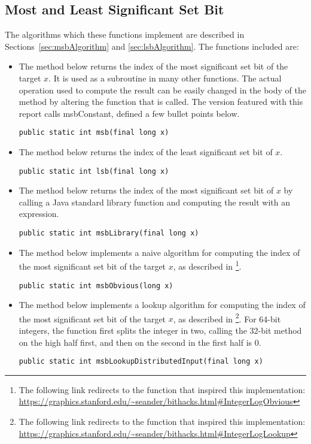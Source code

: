 \subsection{Most and Least Significant Set Bit}

The algorithms which these functions implement are described in Sections~\ref{sec:msbAlgorithm} and \ref{sec:lsbAlgorithm}.
The functions included are:

\begin{itemize}
    \item
    The method below returns the index of the most significant set bit of the target $x$. It is used as a subroutine in many other functions. The actual operation used to compute the result can be easily changed in the body of the method by altering the function that is called. The version featured with this report calls {\ttfamily msbConstant}, defined a few bullet points below.
    \begin{lstlisting}
public static int msb(final long x)
    \end{lstlisting}
    
    \item
    The method below returns the index of the least significant set bit of $x$.
    \begin{lstlisting}
public static int lsb(final long x)
    \end{lstlisting}
    
    \item
    The method below returns the index of the most significant set bit of $x$ by calling a Java standard library function and computing the result with an expression.
    \begin{lstlisting}
public static int msbLibrary(final long x)
    \end{lstlisting}
    
    \item
    The method below implements a naive algorithm for computing the index of the most significant set bit of the target $x$, as described in \cite{bittricks}\footnote{The following link redirects to the function that inspired this implementation: \url{https://graphics.stanford.edu/~seander/bithacks.html\#IntegerLogObvious}}.
    \begin{lstlisting}
public static int msbObvious(long x)
    \end{lstlisting}
    
    \item
    The method below implements a lookup algorithm for computing the index of the most significant set bit of the target $x$, as described in \cite{bittricks}\footnote{The following link redirects to the function that inspired this implementation: \url{https://graphics.stanford.edu/~seander/bithacks.html\#IntegerLogLookup}}. For 64-bit integers, the function first splits the integer in two, calling the 32-bit method on the high half first, and then on the second in the first half is $0$.
    \begin{lstlisting}
public static int msbLookupDistributedInput(final long x)
    \end{lstlisting}


\end{itemize}
